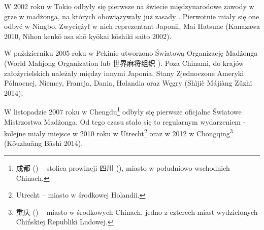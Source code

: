 \label{pierwsze_mistrzostwa}
W 2002 roku w Tokio odbyły się pierwsze na świecie międzynarodowe zawody w grze
w madżonga, na których obowiązywały już zasady 
. Pierwotnie miały się one odbyć w Ningbo. Zwyciężył w nich
reprezentant Japonii, Mai Hatsune (Kanazawa 2010, Nihon kenkō asa shō kyōkai
kōshiki saito 2002).

\label{wmo}
W październiku 2005 roku w Pekinie utworzono Światową Organizację Madżonga
(World Mahjong Organization lub 世界麻将组织 ).
Poza Chinami, do krajów założycielskich należały między innymi Japonia, Stany
Zjednoczone Ameryki Północnej, Niemcy, Francja, Dania, Holandia oraz Węgry
(Shìjiè Májiàng Zǔzhī 2014).

W listopadzie 2007 roku w Chengdu\footnote{成都 () -- stolica
prowincji 四川 (), miasto w południowo-wschodnich Chinach.} odbyły
się pierwsze oficjalne Światowe Mistrzostwa Madżonga. Od tego czasu stało się to
regularnym wydarzeniem - kolejne miały miejsce w 2010 roku w
Utrecht\footnote{Utrecht --  miasto w środkowej Holandii.} oraz w 2012 w
Chongqing\footnote{重庆 () -- miasto w środkowych Chinach, jedno
z czterech miast wydzielonych Chińskiej Republiki Ludowej.} (Kǒuzhuāng Bāshì
2014).






 














